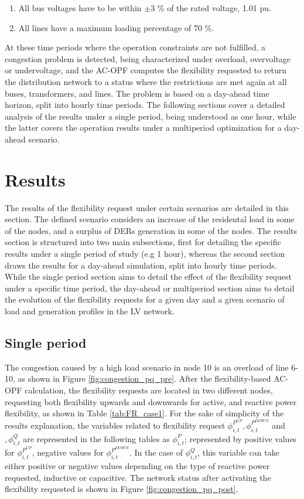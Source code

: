 \begin{enumerate}
\item All bus voltages have to be within $\pm 3$ \% of the rated voltage, 1.01 pu.
\item All lines have a maximum loading percentage of 70 \%. 
\end{enumerate}

At these time periods where the operation constraints are not fulfilled, a congestion problem is detected, being characterized under overload, overvoltage or undervoltage, and the AC-OPF computes the flexibility requested to return the distribution network to a status where the restrictions are met again at all buses, transformers, and lines. The problem is based on a day-ahead time horizon, split into hourly time periods. The following sections cover a detailed analysis of the results under a single period, being understood as one hour, while the latter covers the operation results under a multiperiod optimization for a day-ahead scenario.  

\section{Results}
The results of the flexibility request under certain scenarios are detailed in this section. The defined scenario considers an increase of the residental load in some of the nodes, and a surplus of DERs generation in some of the nodes. The results section is structured into two main subsections, first for detailing the specific results under a single period of study (e.g 1 hour), whereas the second section draws the results for a day-ahead simulation, split into hourly time periods. While the single period section aims to detail the effect of the flexibility request under a specific time period, the day-ahead or multiperiod section aims to detail the evolution of the flexibility requests for a given day and a given scenario of load and generation profiles in the LV network. 
\subsection{Single period}
The congestion caused by a high load scenario in node 10 is an overload of line 6-10, as shown in Figure \ref{fig:congestion_pq_pre}. After the flexibility-based AC-OPF calculation, the flexibility requests are located in two different nodes, requesting both flexibility upwards and downwards for active, and reactive power flexibility, as shown in Table \ref{tab:FR_case1}. For the sake of simplicity of the results explanation, the variables related to flexibility request $\phi_{i,t}^{P^{UP}},\phi_{i,t}^{P^{DOWN}}$ and $,\phi_{i,t}^{Q}$ are represented in the following tables as $\phi_{i,t}^{P}$; represented by positive values for $\phi_{i,t}^{P^{UP}}$, negative values for $\phi_{i,t}^{P^{DOWN}}$. In the case of $\phi_{i,t}^{Q}$, this variable can take either positive or negative values depending on the type of reactive power requested, inductive or capacitive. The network status after activating the flexibility requested is shown in Figure \ref{fig:congestion_pq_post}.

